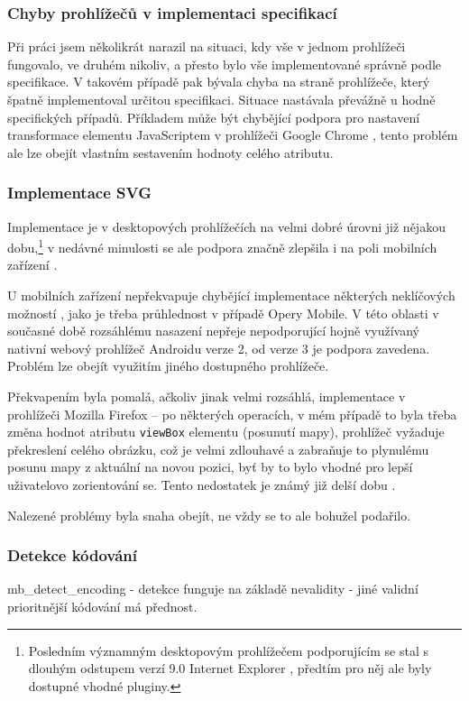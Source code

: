 \subsubsection{Chyby prohlížečů v implementaci specifikací}
Při práci jsem několikrát narazil na situaci, kdy vše v jednom prohlížeči fungovalo, ve druhém nikoliv, a přesto bylo vše implementované správně podle specifikace. V takovém případě pak bývala chyba na straně prohlížeče, který špatně implementoval určitou specifikaci. Situace nastávala převážně u hodně specifických případů. Příkladem může být chybějící podpora pro nastavení transformace  elementu JavaScriptem v prohlížeči Google Chrome \cite{BugChromeTran}, tento problém ale lze obejít vlastním sestavením hodnoty celého atributu. 

\subsubsection{Implementace SVG}
Implementace  je v desktopových prohlížečích na velmi dobré úrovni již nějakou dobu,\footnote{Posledním významným desktopovým prohlížečem podporujícím  se stal s dlouhým odstupem verzí 9.0 Internet Explorer \cite{CanIUse}, předtím pro něj ale byly dostupné vhodné pluginy.} v nedávné minulosti se ale podpora značně zlepšila i na poli mobilních zařízení \cite{CanIUse}.

U mobilních zařízení nepřekvapuje chybějící implementace některých neklíčových možností , jako je třeba průhlednost v případě Opery Mobile. V této oblasti v současné době rozsáhlému nasazení nepřeje  nepodporující hojně využívaný nativní webový prohlížeč Androidu verze 2, od verze 3 je podpora zavedena. Problém lze obejít využitím jiného dostupného prohlížeče.

Překvapením byla pomalá, ačkoliv jinak velmi rozsáhlá, implementace  v prohlížeči Mozilla Firefox -- po některých operacích, v mém případě to byla třeba změna hodnot atributu \texttt{viewBox}  elementu (posunutí mapy), prohlížeč vyžaduje překreslení celého obrázku, což je velmi zdlouhavé a zabraňuje to plynulému posunu mapy z aktuální na novou pozici, byť by to bylo vhodné pro lepší uživatelovo zorientování se. Tento nedostatek je známý již delší dobu \cite{Bugzilla}.

Nalezené problémy byla snaha obejít, ne vždy se to ale bohužel podařilo.

\subsubsection{Detekce kódování}
mb\_detect\_encoding - detekce funguje na základě nevalidity - jiné validní prioritnější kódování má přednost.

